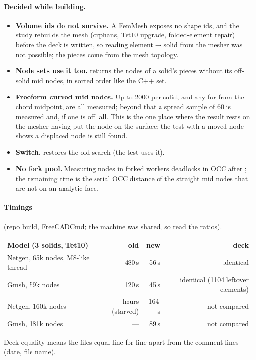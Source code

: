 \paragraph{Decided while building.}
\begin{itemize}[nosep]
  \item \textbf{Volume ids do not survive.} A FemMesh exposes no shape ids, and the study rebuilds the mesh (orphans,
        Tet10 upgrade, folded-element repair) before the deck is written, so reading element$\to$solid from the mesher was
        not possible; the pieces come from the mesh topology.
  \item \textbf{Node sets use it too.}  returns the nodes of a solid's pieces without
        its off-solid mid nodes, in sorted order like the C++ set.
  \item \textbf{Freeform curved mid nodes.} Up to 2000 per solid, and any far from the chord midpoint, are all
        measured; beyond that a spread sample of 60 is measured and, if one is off, all. This is the one place where the
        result rests on the mesher having put the node on the surface; the test with a moved node shows a displaced node
        is still found.
  \item \textbf{Switch.}  restores the old search (the test uses it).
  \item \textbf{No fork pool.} Measuring nodes in forked workers deadlocks in OCC after ; the remaining time is
        the serial OCC distance of the straight mid nodes that are not on an analytic face.
\end{itemize}

\paragraph{Timings} (repo build, FreeCADCmd; the machine was shared, so read the ratios).
\begin{center}
\begin{tabular}{lrrr}
\hline
Model (3 solids, Tet10) & old & new & deck \\
\hline
Netgen, 65k nodes, M8-like thread & 480\,s & 56\,s & identical \\
Gmsh, 59k nodes & 120\,s & 45\,s & identical (1104 leftover elements) \\
Netgen, 160k nodes & hours (starved) & 164\,s & not compared \\
Gmsh, 181k nodes & --- & 89\,s & not compared \\
\hline
\end{tabular}
\end{center}
Deck equality means the  files equal line for line apart from the comment lines (date, file name).

